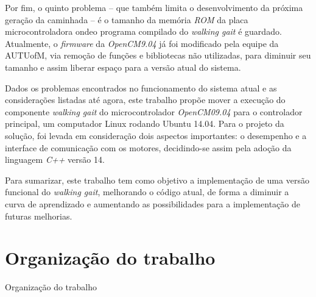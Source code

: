 Por fim, o quinto problema -- que também limita o desenvolvimento da próxima geração da caminhada -- é o tamanho da memória \textit{ROM} da placa microcontroladora ondeo programa compilado do \textit{walking gait} é guardado. Atualmente, o \textit{firmware} da \textit{OpenCM9.04} já foi modificado pela equipe da AUTUofM, via remoção de funções e bibliotecas não utilizadas, para diminuir seu tamanho e  assim liberar espaço para a versão atual do sistema.

Dados os problemas encontrados no funcionamento do sistema atual e as considerações listadas até agora, este trabalho propõe mover a execução do componente \textit{walking gait} do microcontrolador \textit{OpenCM09.04} para o controlador principal, um computador Linux rodando Ubuntu 14.04. Para o projeto da solução, foi levada em consideração dois aspectos importantes: o desempenho e a interface de comunicação com os motores, decidindo-se assim pela adoção da linguagem \textit{C++} versão 14.

Para sumarizar, este trabalho tem como objetivo a implementação de uma versão funcional do \textit{walking gait}, melhorando o código atual, de forma a diminuir a curva de aprendizado e aumentando as possibilidades para a implementação de futuras melhorias.

\section{Organização do trabalho}

Organização do trabalho